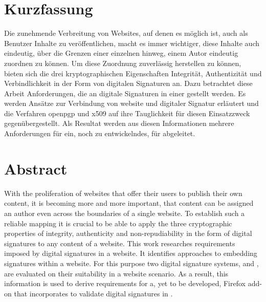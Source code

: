 

\noindent
\begin{minipage}{\textwidth}
\chapter*{Kurzfassung}
Die zunehmende Verbreitung von Websites, auf denen es möglich ist, auch als Benutzer Inhalte zu veröffentlichen, macht es immer wichtiger, diese Inhalte auch
eindeutig, über die Grenzen einer einzelnen  hinweg, einem Autor eindeutig zuordnen zu können. Um diese Zuordnung zuverlässig herstellen zu
können, bieten sich die drei kryptographischen Eigenschaften Integrität, Authentizität und Verbindlichkeit in der Form von digitalen Signaturen an. Dazu
betrachtet diese Arbeit Anforderungen, die an digitale Signaturen in einer  gestellt werden. Es werden Ansätze zur Verbindung von
\gls{website} und digitaler Signatur erläutert und die Verfahren \gls{openpgp} und \gls{x509} auf ihre Tauglichkeit für diesen Einsatzzweck gegenübergestellt.
Als Resultat werden aus diesen Informationen mehrere Anforderungen für ein, noch zu entwickelndes,  für  abgeleitet.

\chapter*{Abstract}
With the proliferation of websites that offer their users to publish their own content, it is becoming more and more important, that content can be assigned an
author even across the boundaries of a single website. To establish such a reliable mapping it is crucial to be able to apply the three cryptographic
properties of integrity, authenticity and non-repudiability in the form of digital signatures to any content of a website. This work researches requirements
imposed by digital signatures in a website. It identifies approaches to embedding signatures within a website. For this purpose two digital signature systems,
 and , are evaluated on their suitability in a website scenario. As a result, this information is used to derive requirements
for a, yet to be developed, Firefox add-on that incorporates  to validate digital signatures in .

\end{minipage}
